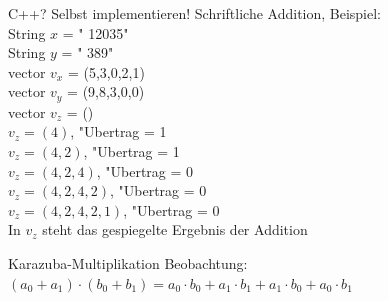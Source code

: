 \documentclass[18pt]{beamer}
\begin{document}
\begin{frame} {C++? Selbst implementieren!}
Schriftliche Addition, Beispiel: \\
String $x$ = " 12035"  \\
String $y$ = " 389" \\
\pause
vector $v_{x}$ = (5,3,0,2,1)\\
vector $v_{y}$ = (9,8,3,0,0)\\
vector $v_{z}$ = ()\\
\pause
$v_{z} = (4)$, "Ubertrag = 1\\
\pause
$v_{z} = (4,2)$, "Ubertrag = 1\\
\pause
$v_{z} = (4,2,4)$, "Ubertrag = 0\\
\pause
$v_{z} = (4,2,4,2)$, "Ubertrag = 0\\
\pause
$v_{z} = (4,2,4,2,1)$, "Ubertrag = 0\\
In $v_{z}$ steht das gespiegelte Ergebnis der Addition
\end{frame} 
 
\begin{frame} {Karazuba-Multiplikation}
Beobachtung: $(a_{0}+a_{1})\cdot(b_{0}+b_{1})=a_{0}\cdot b_{0} + a_{1}\cdot b_{1} + a_{1}\cdot b_{0}+
a_{0}\cdot b_{1}$
\end{frame}
\end{document}
